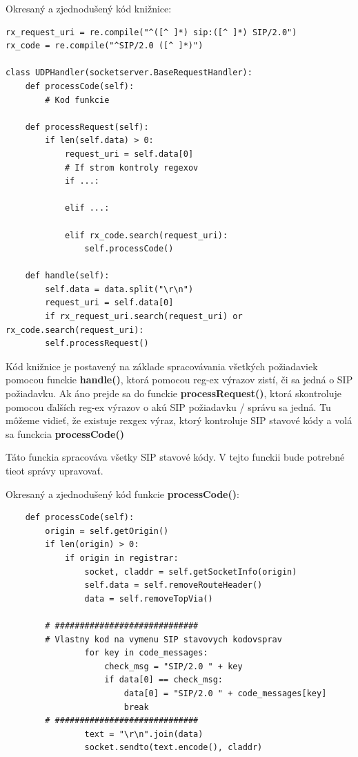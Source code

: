 \documentclass[10pt,oneside,slovak,a4paper]{article}
\begin{document}
\newpage
Okresaný a zjednodušený kód knižnice:
\begin{verbatim}
rx_request_uri = re.compile("^([^ ]*) sip:([^ ]*) SIP/2.0")
rx_code = re.compile("^SIP/2.0 ([^ ]*)")
 
class UDPHandler(socketserver.BaseRequestHandler):
	def processCode(self):
		# Kod funkcie

	def processRequest(self):
		if len(self.data) > 0:
			request_uri = self.data[0]
			# If strom kontroly regexov
			if ...:
				
			elif ...:

			elif rx_code.search(request_uri):
				self.processCode() 

	def handle(self):
		self.data = data.split("\r\n")
		request_uri = self.data[0]
		if rx_request_uri.search(request_uri) or rx_code.search(request_uri):
		self.processRequest()
\end{verbatim}

Kód knižnice je postavený na základe spracovávania všetkých požiadaviek pomocou funckie \textbf{handle()}, ktorá pomocou reg-ex výrazov zistí, či sa jedná o SIP požiadavku. Ak áno prejde sa do funckie \textbf{processRequest()}, ktorá skontroluje pomocou ďalších reg-ex výrazov o akú SIP požiadavku / správu sa jedná. Tu môžeme vidieť, že existuje rexgex výraz, ktorý kontroluje SIP stavové kódy a volá sa funckcia \textbf{processCode()}

Táto funckia spracováva všetky SIP stavové kódy. V tejto funckii bude potrebné tieot správy upravovať.

Okresaný a zjednodušený kód funkcie \textbf{processCode()}:
\begin{verbatim}
    def processCode(self):
        origin = self.getOrigin()
        if len(origin) > 0:
            if origin in registrar:
                socket, claddr = self.getSocketInfo(origin)
                self.data = self.removeRouteHeader()
                data = self.removeTopVia()

		# #############################
		# Vlastny kod na vymenu SIP stavovych kodovsprav
                for key in code_messages:
                    check_msg = "SIP/2.0 " + key
                    if data[0] == check_msg:
                        data[0] = "SIP/2.0 " + code_messages[key]
                        break
		# #############################
                text = "\r\n".join(data)
                socket.sendto(text.encode(), claddr)
\end{verbatim}
\end{document}
